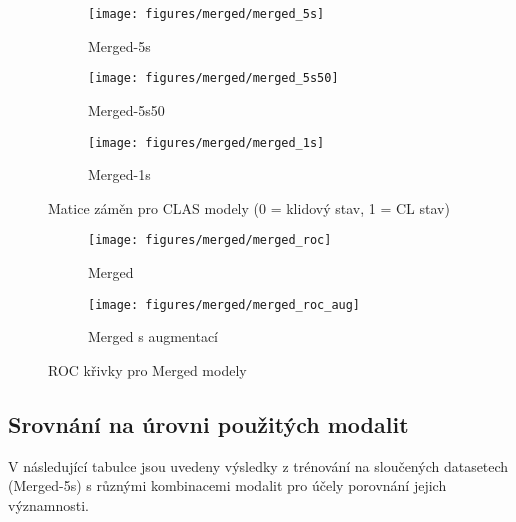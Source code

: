\begin{figure}[!htb]
    \centering
    \begin{subfigure}[h]{0.32\linewidth}
        \texttt{[image: figures/merged/merged\_5s]}
        \caption{Merged-5s}
    \end{subfigure}
    \hspace{0.05cm}
    \begin{subfigure}[h]{0.32\linewidth}
        \texttt{[image: figures/merged/merged\_5s50]}
        \caption{Merged-5s50}
    \end{subfigure}
    \hspace{0.05cm}
    \begin{subfigure}[h]{0.32\linewidth}
        \texttt{[image: figures/merged/merged\_1s]}
        \caption{Merged-1s}
    \end{subfigure}
    \caption{Matice záměn pro CLAS modely (0 = klidový stav, 1 = CL stav)}
    \label{fig:results_cm_merged}
\end{figure}

\begin{figure}[!htb]
    \centering
    \begin{subfigure}[h]{0.42\linewidth}
        \texttt{[image: figures/merged/merged\_roc]}
        \caption{Merged}
    \end{subfigure}
    \hspace{0.1cm}
    \begin{subfigure}[h]{0.42\linewidth}
        \texttt{[image: figures/merged/merged\_roc\_aug]}
        \caption{Merged s augmentací}
    \end{subfigure}
    \caption{ROC křivky pro Merged modely}
    \label{fig:results_roc_merged}
\end{figure}

\subsection{Srovnání na úrovni použitých modalit}
\label{subsec:features_comparison}
V následující tabulce jsou uvedeny výsledky z trénování na sloučených datasetech
(Merged-5s) s různými kombinacemi modalit pro účely porovnání jejich
významnosti.

